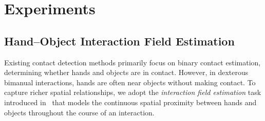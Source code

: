 \documentclass[10pt,twocolumn,letterpaper]{article}
\begin{document}
\section{Experiments}

\subsection{Hand--Object Interaction Field Estimation}

Existing contact detection methods primarily focus on binary contact estimation, determining whether hands and objects are in contact. However, in dexterous bimanual interactions, hands are often near objects without making contact. To capture richer spatial relationships, we adopt the \emph{interaction field estimation} task introduced in~\cite{fan2023arctic} that models the continuous spatial proximity between hands and objects throughout the course of an interaction.

\begin{table}[b]
\centering
{}%
\caption{\textbf{Evaluation of interaction field estimation.}}
\label{tab:cross_field_estimation}
\end{table}
\end{document}
